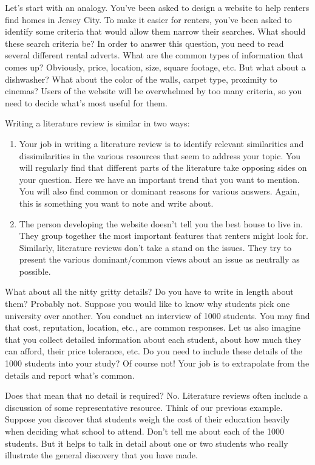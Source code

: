 \documentclass[]{article}
\begin{document}
Let's start with an analogy. You've been asked to design a website to
help renters find homes in Jersey City. To make it easier for renters,
you've been asked to identify some criteria that would allow them narrow
their searches. What should these search criteria be? In order to answer
this question, you need to read several different rental adverts. What
are the common types of information that comes up? Obviously, price,
location, size, square footage, etc. But what about a dishwasher? What
about the color of the walls, carpet type, proximity to cinemas? Users
of the website will be overwhelmed by too many criteria, so you need to
decide what's most useful for them.

Writing a literature review is similar in two ways:

\begin{enumerate}
\def\labelenumi{\arabic{enumi}.}
\itemsep1pt\parskip0pt
\item
  Your job in writing a literature review is to identify relevant
  similarities and dissimilarities in the various resources that seem to
  address your topic. You will regularly find that different parts of
  the literature take opposing sides on your question. Here we have an
  important trend that you want to mention. You will also find common or
  dominant reasons for various answers. Again, this is something you
  want to note and write about.
\item
  The person developing the website doesn't tell you the best house to
  live in. They group together the most important features that renters
  might look for. Similarly, literature reviews don't take a stand on
  the issues. They try to present the various dominant/common views
  about an issue as neutrally as possible.
\end{enumerate}

What about all the nitty gritty details? Do you have to write in length
about them? Probably not. Suppose you would like to know why students
pick one university over another. You conduct an interview of 1000
students. You may find that cost, reputation, location, etc., are common
responses. Let us also imagine that you collect detailed information
about each student, about how much they can afford, their price
tolerance, etc. Do you need to include these details of the 1000
students into your study? Of course not! Your job is to extrapolate from
the details and report what's common.

Does that mean that no detail is required? No. Literature reviews often
include a discussion of some representative resource. Think of our
previous example. Suppose you discover that students weigh the cost of
their education heavily when deciding what school to attend. Don't tell
me about each of the 1000 students. But it helps to talk in detail about
one or two students who really illustrate the general discovery that you
have made.
\end{document}
